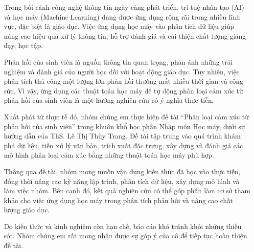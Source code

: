
Trong bối cảnh công nghệ thông tin ngày càng phát triển, trí tuệ nhân tạo (AI) và học máy (Machine Learning) đang được ứng dụng rộng rãi trong nhiều lĩnh vực, đặc biệt là giáo dục. Việc ứng dụng học máy vào phân tích dữ liệu giúp nâng cao hiệu quả xử lý thông tin, hỗ trợ đánh giá và cải thiện chất lượng giảng dạy, học tập.

Phản hồi của sinh viên là nguồn thông tin quan trọng, phản ánh những trải nghiệm và đánh giá của người học đối với hoạt động giáo dục. Tuy nhiên, việc phân tích thủ công một lượng lớn phản hồi thường mất nhiều thời gian và công sức. Vì vậy, ứng dụng các thuật toán học máy để tự động phân loại cảm xúc từ phản hồi của sinh viên là một hướng nghiên cứu có ý nghĩa thực tiễn.

Xuất phát từ thực tế đó, nhóm chúng em thực hiện đề tài “Phân loại cảm xúc từ phản hồi của sinh viên” trong khuôn khổ học phần Nhập môn Học máy, dưới sự hướng dẫn của ThS. Lê Thị Thùy Trang. Đề tài tập trung vào quá trình khám phá dữ liệu, tiền xử lý văn bản, trích xuất đặc trưng, xây dựng và đánh giá các mô hình phân loại cảm xúc bằng những thuật toán học máy phù hợp.

Thông qua đề tài, nhóm mong muốn vận dụng kiến thức đã học vào thực tiễn, đồng thời nâng cao kỹ năng lập trình, phân tích dữ liệu, xây dựng mô hình và làm việc nhóm. Bên cạnh đó, kết quả nghiên cứu có thể góp phần làm cơ sở tham khảo cho việc ứng dụng học máy trong phân tích phản hồi và nâng cao chất lượng giáo dục.

Do kiến thức và kinh nghiệm còn hạn chế, báo cáo khó tránh khỏi những thiếu sót. Nhóm chúng em rất mong nhận được sự góp ý của cô để tiếp tục hoàn thiện đề tài.